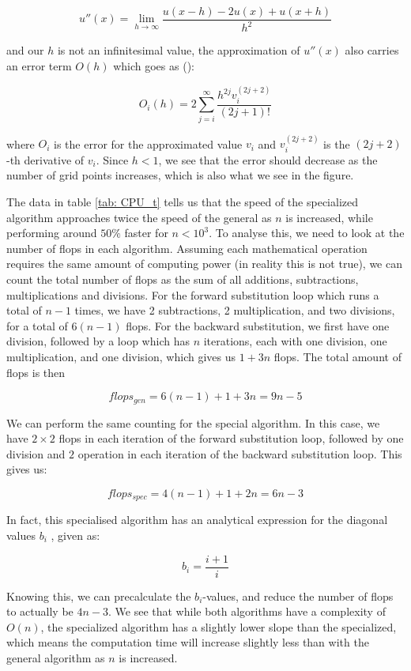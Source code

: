 \documentclass[a4paper,10pt,English]{article}
\begin{document}
$$u''(x) = \lim_{h \to \infty} \frac{u(x-h) - 2u(x) + u(x + h)}{h^2}$$

and our $h$ is not an infinitesimal value, the approximation of $u''(x)$ also carries an error term $O(h)$ which goes as (\cite{Hjorth-Jensen2015}):

$$O_i(h) = 2 \sum_{j = i}^\infty \frac{h^{2j} v_i^{(2j+2)}}{(2j+1)!}$$

where $O_i$ is the error for the approximated value $v_i$ and $v_i^{(2j+2)}$ is the $(2j+2)$-th derivative of $v_i$. Since $h < 1$, we see that the error should decrease as the number of grid points increases, which is also what we see in the figure. 

\newline

The data in table \ref{tab: CPU_t} tells us that the speed of the specialized algorithm approaches twice the speed of the general as $n$ is increased, while performing around $50\%$ faster for $n < 10^3$. To analyse this, we need to look at the number of flops in each algorithm. Assuming each mathematical operation requires the same amount of computing power (in reality this is not true), we can count the total number of flops as the sum of all additions, subtractions, multiplications and divisions. For the forward substitution loop which runs a total of $n-1$ times, we have 2 subtractions, 2 multiplication, and two divisions, for a total of $6(n-1)$ flops. For the backward substitution, we first have one division, followed by a loop which has $n$ iterations, each with one division, one multiplication, and one division, which gives us $1 + 3n$ flops. The total amount of flops is then 

$$flops_{gen} = 6(n-1) + 1 + 3n = 9n - 5$$

We can perform the same counting for the special algorithm. In this case, we have $2\times 2$ flops in each iteration of the forward substitution loop, followed by one division and $2$ operation in each iteration of the backward substitution loop. This gives us:

$$flops_{spec} = 4(n-1) + 1 + 2n = 6n - 3$$

In fact, this specialised algorithm has an analytical expression for the diagonal values $b_i$ \cite{Hjorth-Jensen2015}, given as:

$$b_i = \frac{i+1}{i}$$

Knowing this, we can precalculate the $b_i$-values, and reduce the number of flops to actually be $4n - 3$. We see that while both algorithms have a complexity of $O(n)$, the specialized algorithm has a slightly lower slope than the specialized, which means the computation time will increase slightly less than with the general algorithm as $n$ is increased.
\end{document}
